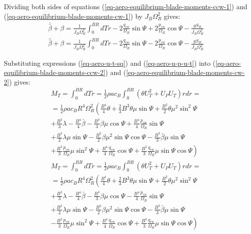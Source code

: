 Dividing both sides of equations (\ref{eq-aero-equilibrium-blade-moments-ccw-1}) and (\ref{eq-aero-equilibrium-blade-moments-cw-1}) by $J_B \Omega_R^2$ gives:
\begin{gather}
  \label{eq-aero-equilibrium-blade-moments-ccw-2}
  \bar{\bar \beta} + \beta
  = \frac{1}{ J_B \Omega_R^2 } \int_{0}^{BR} dT r
  - 2 \frac{q_{cw}}{\Omega_R} \sin \Psi
  + 2 \frac{p_{cw}}{\Omega_R} \cos \Psi
  - \frac{g S_B}{J_B \Omega_R^2} \\
  \label{eq-aero-equilibrium-blade-moments-cw-2}
    \bar{\bar \beta} + \beta
  = \frac{1}{ J_B \Omega_R^2 } \int_{0}^{BR} dT r
  - 2 \frac{q_{cw}}{\Omega_R} \sin \Psi
  - 2 \frac{p_{cw}}{\Omega_R} \cos \Psi
  - \frac{g S_B}{J_B \Omega_R^2}
\end{gather}

Substituting expressions (\ref{eq-aero-u-t-sq}) and (\ref{eq-aero-u-p-u-t}) into (\ref{eq-aero-equilibrium-blade-moments-ccw-2}) and (\ref{eq-aero-equilibrium-blade-moments-cw-2}) gives:
\begin{multline}
  \label{eq-aero-blade-moment-thrust-ccw}
  M_T =
  \int_{0}^{BR} dT r =
  \frac{1}{2} \rho a c_B
  \int_{0}^{BR} \left( \theta U_T^2 + U_P U_T \right) r dr = \\
  =
  \frac{1}{2} \rho a c_B R^4 \Omega_R^2
  \left(
    \frac{B^4}{4} \theta
  + \frac{2}{3} B^3 \theta \mu \sin \Psi
  + \frac{B^2}{2} \theta \mu^2 \sin^2 \Psi
  \right.
  \\
  + \frac{B^3}{3} \lambda
  - \frac{B^4}{4} \bar \beta
  - \frac{B^3}{3} \beta \mu \cos \Psi
  + \frac{B^4}{4} \frac{p_{cw}}{\Omega_R} \sin \Psi \\
  + \frac{B^2}{2} \lambda \mu \sin \Psi
  - \frac{B^2}{2} \beta \mu^2 \sin \Psi \cos \Psi
  - \frac{B^3}{3} \bar \beta \mu \sin \Psi
  \\
  \left.
  + \frac{B^3}{3} \frac{p_{cw}}{\Omega_R} \mu \sin^2 \Psi
  + \frac{B^4}{4} \frac{q_{cw}}{\Omega_R} \cos \Psi
  + \frac{B^3}{3} \frac{q_{cw}}{\Omega_R} \mu \sin \Psi \cos \Psi
  \right)
\end{multline}
\begin{multline}
  \label{eq-aero-blade-moment-thrust-cw}
  M_T =
  \int_{0}^{BR} dT r =
  \frac{1}{2} \rho a c_B
  \int_{0}^{BR} \left( \theta U_T^2 + U_P U_T \right) r dr = \\
  =
  \frac{1}{2} \rho a c_B R^4 \Omega_R^2
  \left(
    \frac{B^4}{4} \theta
  + \frac{2}{3} B^3 \theta \mu \sin \Psi
  + \frac{B^2}{2} \theta \mu^2 \sin^2 \Psi
  \right.
  \\
  + \frac{B^3}{3} \lambda
  - \frac{B^4}{4} \bar \beta
  - \frac{B^3}{3} \beta \mu \cos \Psi
  - \frac{B^4}{4} \frac{p_{cw}}{\Omega_R} \sin \Psi \\
  + \frac{B^2}{2} \lambda \mu \sin \Psi
  - \frac{B^2}{2} \beta \mu^2 \sin \Psi \cos \Psi
  - \frac{B^3}{3} \bar \beta \mu \sin \Psi
  \\
  \left.
  - \frac{B^3}{3} \frac{p_{cw}}{\Omega_R} \mu \sin^2 \Psi
  + \frac{B^4}{4} \frac{q_{cw}}{\Omega_R} \cos \Psi
  + \frac{B^3}{3} \frac{q_{cw}}{\Omega_R} \mu \sin \Psi \cos \Psi
  \right)
\end{multline}

